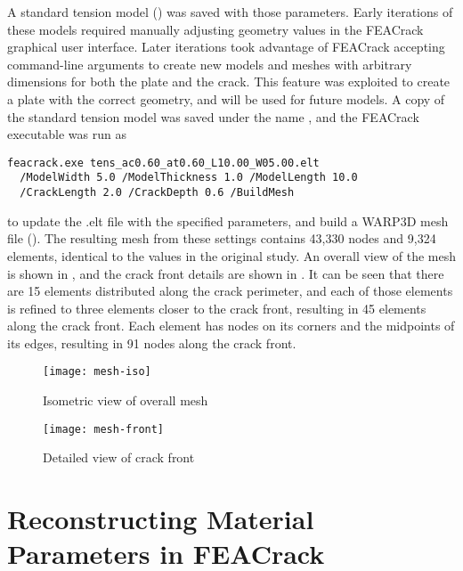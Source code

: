 A standard tension model () was saved with those parameters.
Early iterations of these models required manually adjusting geometry values in the FEACrack graphical user interface.
Later iterations took advantage of FEACrack accepting command-line arguments to create new models and meshes with arbitrary dimensions for both the plate and the crack.
This feature was exploited to create a plate with the correct geometry, and will be used for future models.
A copy of the standard tension model was saved under the name , and the FEACrack executable was run as
\begin{Verbatim}[frame=single]
feacrack.exe tens_ac0.60_at0.60_L10.00_W05.00.elt
  /ModelWidth 5.0 /ModelThickness 1.0 /ModelLength 10.0
  /CrackLength 2.0 /CrackDepth 0.6 /BuildMesh
\end{Verbatim}
to update the .elt file with the specified parameters, and build a WARP3D mesh file ().
The resulting mesh from these settings contains 43,330 nodes and 9,324 elements, identical to the values in the original study.
An overall view of the mesh is shown in , and the crack front details are shown in .
It can be seen that there are 15 elements distributed along the crack perimeter, and each of those elements is refined to three elements closer to the crack front, resulting in 45 elements along the crack front.
Each element has nodes on its corners and the midpoints of its edges, resulting in 91 nodes along the crack front.
\begin{figure}[tbp]
\centering
\texttt{[image: mesh-iso]}
\caption{\label{fig:mesh-iso} Isometric view of overall mesh}
\end{figure}
\begin{figure}[tbp]
\centering
\texttt{[image: mesh-front]}
\caption{\label{fig:mesh-front} Detailed view of crack front}
\end{figure}

\section{Reconstructing Material Parameters in FEACrack}

